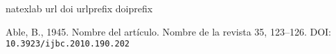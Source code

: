 \documentclass[5p,times,authoryear]{elsarticle}
\begin{document}
 














\begin{thebibliography}{7}

\expandafter\ifx\csname natexlab\endcsname\relax\def\natexlab#1{#1}\fi
\expandafter\ifx\csname url\endcsname\relax
  \def\url#1{\texttt{#1}}\fi
\expandafter\ifx\csname doi\endcsname\relax
  \def\doi#1{\texttt{#1}}\fi
\expandafter\ifx\csname urlprefix\endcsname\relax\def\urlprefix{URL: }\fi
\expandafter\ifx\csname doiprefix\endcsname\relax\def\doiprefix{DOI: }\fi

Able, B., 1945. Nombre del art\'iculo. Nombre de la revista 35, 123--126.
\newline\doiprefix\doi{10.3923/ijbc.2010.190.202}
 

 \end{thebibliography}
 
\end{document}
